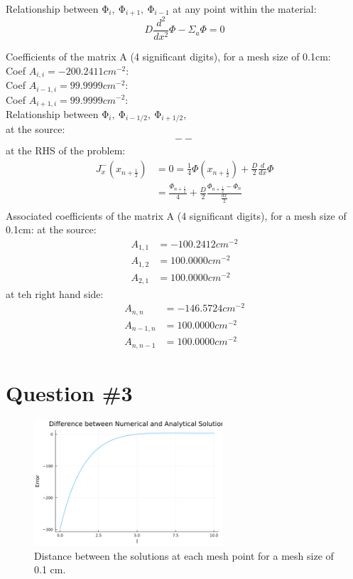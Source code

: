 \documentclass[11pt,a4paper]{article}
\begin{document}
Relationship between $\mathrm{\Phi}_i,\ \mathrm{\Phi}_{i+1},\ \mathrm{\Phi}_{i-1}$ at any point within the material:
\begin{equation}
    D \frac{ d^2 }{ dx^2 } \Phi  -  \Sigma_{a}\Phi = 0
\end{equation}

Coefficients of the matrix A (4 significant digits), for a mesh size of 0.1cm:\\
Coef ${} A_{i,i} = -200.2411 cm^{-2}$: \\
Coef $A_{i-1,i} = 99.9999 cm^{-2}$: \\
Coef $A_{i+1,i} = 99.9999 cm^{-2}$: \\

Relationship between $\mathrm{\Phi}_i,\ \mathrm{\Phi}_{i-1/2},\ \mathrm{\Phi}_{i+1/2}$, \\
at the source:
\begin{align}
--\end{align}
at the RHS of the problem:
\begin{align}
    J_{x}^{-}\left( x_{n+\frac{1}{2}} \right) &= 0  = \frac{1}{4}\Phi\left( x_{n+\frac{1}{2}} \right) + \frac{D}{2} \frac{d}{dx}\Phi  \\
        & = \frac{\Phi_{n+\frac{1}{2}}}{4}+\frac{D}{2} \frac{\Phi_{n+\frac{1}{2}}-\Phi_{n}}{\frac{dx}{2}} \\
\end{align}
Associated coefficients of the matrix A (4 significant digits), for a mesh size of 0.1cm:
at the source:
\begin{align}
    A_{1, 1}     &= -100.2412 cm^{-2}\\
    A_{1, 2}     &=  100.0000 cm^{-2}\\
    A_{2, 1}     &=  100.0000 cm^{-2}
\end{align}
at teh right hand side:
\begin{align}
    A_{n, n}     &= -146.5724 cm^{-2}\\
    A_{n - 1, n} &=  100.0000 cm^{-2}\\
    A_{n, n - 1} &=  100.0000 cm^{-2}
\end{align}

\section{Question \#3}
\begin{figure}[h]
\includegraphics[width=7cm]{../figs/ex1_err_100.png}
\centering
\caption{Distance between the solutions at each mesh point for a mesh size of 0.1 cm.}
\end{figure}
\end{document}
